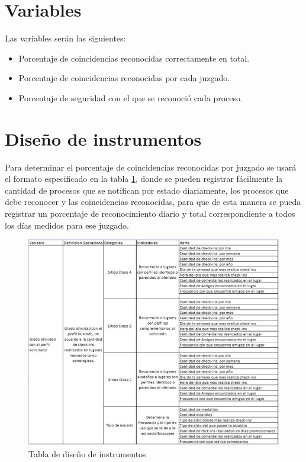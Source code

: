 \section{Variables}
Las variables ser\'an las siguientes:
\begin{itemize}
\item Porcentaje de coincidencias reconocidas correctamente en total.
\item Porcentaje de coincidencias reconocidas por cada juzgado.
\item Porcentaje de seguridad con el que se reconoci\'o cada proceso.

\end{itemize}
\section{Dise\~no de instrumentos}
Para determinar el porcentaje de coincidencias reconocidas por juzgado 
se usar\'a el formato especificado en la tabla \ref{fig:instrumentos}, 
donde se pueden registrar f\'acilmente la cantidad de procesos que se 
notifican por estado diariamente, los procesos que debe reconocer y las
coincidencias reconocidas, para que de esta manera se pueda registrar un
porcentaje de reconocimiento diario y total correspondiente a todos los 
d\'ias medidos para ese juzgado. 

\begin{figure}[h]
\begin{center}
\includegraphics[scale=0.7]{./instrumentos.png}
\end{center}
{\caption{Tabla de dise\~no de instrumentos}\label{fig:instrumentos}}
\end{figure}

